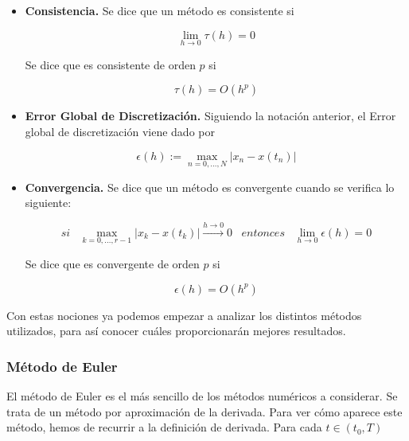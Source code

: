 \begin{itemize}
		\item \textbf{Consistencia.} Se dice que un método es consistente si

				\begin{equation}
						\lim_{h\to 0} \tau(h) = 0	
				\end{equation}

				Se dice que es consistente de orden $p$ si

				\begin{equation}
					\tau(h) = O(h^p)				
				\end{equation}

		\item \textbf{Error Global de Discretización.} Siguiendo la notación
				anterior, el Error global de discretización viene dado por

				\begin{equation}
					\epsilon (h) := \max_{n=0,\ldots,N}|x_n - x(t_n)|
				\end{equation}

		\item \textbf{Convergencia.} Se dice que un método es convergente cuando
				se verifica lo siguiente:

				\begin{equation}
						si \;\;\; \max_{k=0,\ldots,r-1}|x_k - x(t_k)|
						\xrightarrow {h\to 0} 0	\;\;\; entonces \;\;\; \lim_{h\to
						0}\epsilon(h) = 0
				\end{equation}

				Se dice que es convergente de orden $p$ si

				\begin{equation}
						\epsilon(h) = O(h^p)	
				\end{equation}

\end{itemize}

Con estas nociones ya podemos empezar a analizar los distintos métodos
utilizados, para así conocer cuáles proporcionarán mejores resultados. 

\subsubsection{Método de Euler}
\label{makereference5.4.3.1}

El método de Euler es el más sencillo de los métodos numéricos a considerar. Se
trata de un método por aproximación de la derivada. Para ver cómo aparece este
método, hemos de recurrir a la definición de derivada. Para cada $t \in (t_0,T)$

